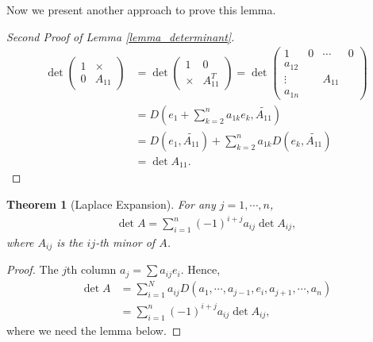 \documentclass[10pt]{book}
\newtheorem{theorem}{Theorem}[chapter]
\theoremstyle{definition}
\numberwithin{equation}{chapter}
\begin{document}
Now we present another approach to prove this lemma.
\begin{proof}[Second Proof of Lemma \ref{lemma_determinant}]
\begin{align*}
    \det \left(
    \begin{matrix}
        1 & \times\\
        0 & A_{11}
    \end{matrix}
    \right) & = \det \left(
    \begin{matrix}
        1 & 0\\
        \times & A_{11}^T
    \end{matrix}
    \right) = \det \left(
    \begin{matrix}
        1      & 0 & \cdots & 0\\
        a_{12} &  &\\
        \vdots &  & A_{11}\\
        a_{1n}
    \end{matrix}
    \right)\\
    & = D\left(e_1 + \sum^n_{k=2}a_{1k}e_k, \widetilde{A_{11}}\right) \\
    & = D(e_1, \widetilde{A_{11}}) + \sum^n_{k=2}a_{1k} D(e_k, \widetilde{A_{11}}) \\
    & = \det A_{11}.
\end{align*}
\end{proof}

\medskip

\begin{theorem}[Laplace Expansion]\label{Laplace_Expansion_Theorem}
For any $j = 1,\cdots,n$, 
\begin{align*}
    \det A = \sum^n_{i=1}(-1)^{i+j} a_{ij} \det A_{ij},
\end{align*}
where $A_{ij}$ is the $ij$-th minor of $A$.
\end{theorem}
\begin{proof}
The $j$th column $a_j = \sum a_{ij} e_i$. Hence,
\begin{align*}
    \det A & = \sum^N_{i=1} a_{ij} D(a_1,\cdots,a_{j-1},e_i, a_{j+1},\cdots,a_n) \\
    & = \sum^n_{i=1} (-1)^{i+j} a_{ij} \det A_{ij},
\end{align*}
where we need the lemma below.
\end{proof}

\medskip
\end{document}
